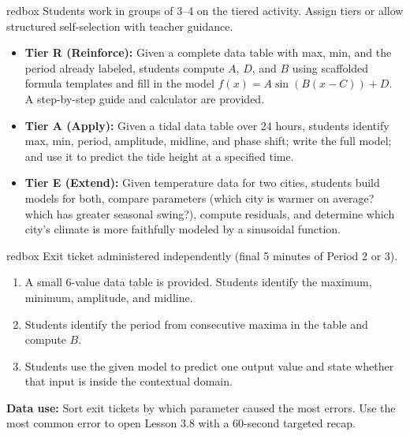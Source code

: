 \documentclass[10pt]{article}
\begin{document}
\vspace{0.08in}

\begin{skillbox}{redbox}
Students work in groups of 3--4 on the tiered activity. Assign tiers or allow
structured self-selection with teacher guidance.

\begin{itemize}[leftmargin=1.4em, itemsep=4pt]
  \item \textbf{Tier R (Reinforce):} Given a complete data table with max, min,
    and the period already labeled, students compute $A$, $D$, and $B$ using
    scaffolded formula templates and fill in the model $f(x) = A\sin(B(x-C))+D$.
    A step-by-step guide and calculator are provided.
  \item \textbf{Tier A (Apply):} Given a tidal data table over 24 hours, students
    identify max, min, period, amplitude, midline, and phase shift; write the full
    model; and use it to predict the tide height at a specified time.
  \item \textbf{Tier E (Extend):} Given temperature data for two cities, students
    build models for both, compare parameters (which city is warmer on average?
    which has greater seasonal swing?), compute residuals, and determine which
    city's climate is more faithfully modeled by a sinusoidal function.
\end{itemize}
\end{skillbox}

\vspace{0.08in}

\begin{skillbox}{redbox}
Exit ticket administered independently (final 5 minutes of Period 2 or 3).

\begin{enumerate}[leftmargin=1.4em, itemsep=4pt]
  \item A small 6-value data table is provided. Students identify the maximum,
    minimum, amplitude, and midline.
  \item Students identify the period from consecutive maxima in the table and
    compute $B$.
  \item Students use the given model to predict one output value and state whether
    that input is inside the contextual domain.
\end{enumerate}

\textbf{Data use:} Sort exit tickets by which parameter caused the most errors.
Use the most common error to open Lesson 3.8 with a 60-second targeted recap.
\end{skillbox}
\end{document}
